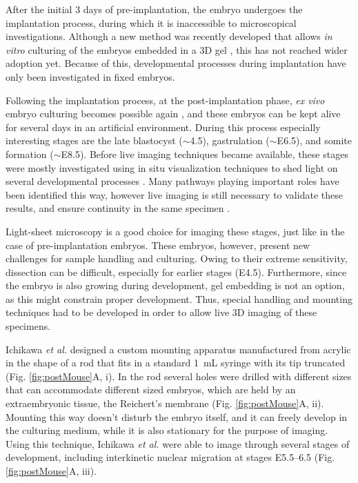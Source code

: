     After the initial 3 days of pre-implantation, the embryo undergoes the implantation process, during which it is inaccessible to microscopical investigations. Although a new method was recently developed that allows \textit{in vitro} culturing of the embryos embedded in a 3D gel \cite{panavaite_3d-geec:_2017}, this has not reached wider adoption yet. Because of this, developmental processes during implantation have only been investigated in fixed embryos.
    
    Following the implantation process, at the post-implantation phase, \textit{ex vivo} embryo culturing becomes possible again \cite{hsu_vitro_1979, huang_effect_2001}, and these embryos can be kept alive for several days in an artificial environment. During this process especially interesting stages are the late blastocyst ($\sim$4.5), gastrulation ($\sim$E6.5), and somite formation ($\sim$E8.5). Before live imaging techniques became available, these stages were mostly investigated using in situ visualization techniques to shed light on several developmental processes \cite{nowotschin_cellular_2010}. Many pathways playing important roles have been identified this way, however live imaging is still necessary to validate these results, and ensure continuity in the same specimen \cite{garcia_live_2011}.

    Light-sheet microscopy is a good choice for imaging these stages, just like in the case of pre-implantation embryos. These embryos, however, present new challenges for sample handling and culturing. Owing to their extreme sensitivity, dissection can be difficult, especially for earlier stages (E4.5). Furthermore, since the embryo is also growing during development, gel embedding is not an option, as this might constrain proper development. Thus, special handling and mounting techniques had to be developed in order to allow live 3D imaging of these specimens.

    Ichikawa \textit{et al.} \cite{ichikawa_live_2013} designed a custom mounting apparatus manufactured from acrylic in the shape of a rod that fits in a standard \SI{1}{mL} syringe with its tip truncated (Fig. \ref{fig:postMouse}A, i). In the rod several holes were drilled with different sizes that can accommodate different sized embryos, which are held by an extraembryonic tissue, the Reichert's membrane (Fig. \ref{fig:postMouse}A, ii). Mounting this way doesn't disturb the embryo itself, and it can freely develop in the culturing medium, while it is also stationary for the purpose of imaging. Using this technique, Ichikawa \textit{et al.} were able to image through several stages of development, including interkinetic nuclear migration at stages E5.5--6.5 (Fig. \ref{fig:postMouse}A, iii).

